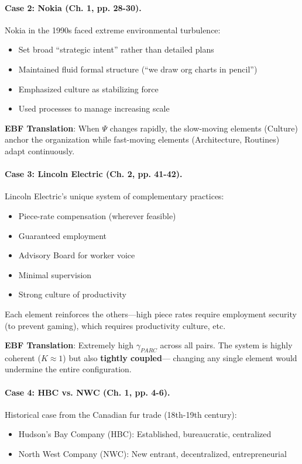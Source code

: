 \paragraph{Case 2: Nokia (Ch. 1, pp. 28-30).}
Nokia in the 1990s faced extreme environmental turbulence:
\begin{itemize}
    \item Set broad ``strategic intent'' rather than detailed plans
    \item Maintained fluid formal structure (``we draw org charts in pencil'')
    \item Emphasized culture as stabilizing force
    \item Used processes to manage increasing scale
\end{itemize}

\textbf{EBF Translation}: When $\Psi$ changes rapidly, the slow-moving 
elements (Culture) anchor the organization while fast-moving elements 
(Architecture, Routines) adapt continuously.

\paragraph{Case 3: Lincoln Electric (Ch. 2, pp. 41-42).}
Lincoln Electric's unique system of complementary practices:
\begin{itemize}
    \item Piece-rate compensation (wherever feasible)
    \item Guaranteed employment
    \item Advisory Board for worker voice
    \item Minimal supervision
    \item Strong culture of productivity
\end{itemize}

Each element reinforces the others---high piece rates require employment 
security (to prevent gaming), which requires productivity culture, etc.

\textbf{EBF Translation}: Extremely high $\gamma_{PARC}$ across all pairs.
The system is highly coherent ($K \approx 1$) but also \textbf{tightly coupled}---
changing any single element would undermine the entire configuration.

\paragraph{Case 4: HBC vs. NWC (Ch. 1, pp. 4-6).}
Historical case from the Canadian fur trade (18th-19th century):
\begin{itemize}
    \item Hudson's Bay Company (HBC): Established, bureaucratic, centralized
    \item North West Company (NWC): New entrant, decentralized, entrepreneurial
\end{itemize}

